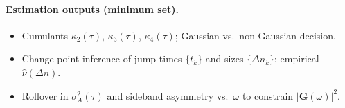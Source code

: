 \paragraph{Estimation outputs (minimum set).}
\begin{itemize}\itemsep0.2em
  \item Cumulants $\kappa_2(\tau)$, $\kappa_3(\tau)$, $\kappa_4(\tau)$; Gaussian vs.\ non-Gaussian decision.
  \item Change-point inference of jump times $\{t_k\}$ and sizes $\{\Delta n_k\}$; empirical $\hat{\nu}(\Delta n)$.
  \item Rollover in $\sigma_A^2(\tau)$ and sideband asymmetry vs.\ $\omega$ to constrain $|\mathbf{G}(\omega)|^2$.
\end{itemize}%